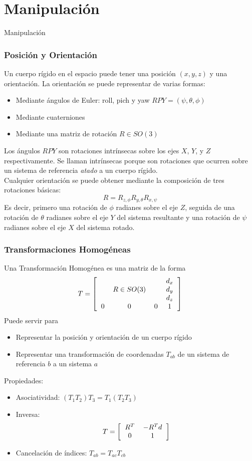 
\section{Manipulación}

\begin{frame}
  \Huge
  Manipulación
\end{frame}

\begin{frame}\frametitle{Posición y Orientación}
  Un cuerpo rígido en el espacio puede tener una posición $(x,y,z)$ y una orientación. La orientación se puede representar de varias formas:
  \begin{itemize}
  \item Mediante ángulos de Euler: roll, pich y yaw $RPY = (\psi, \theta, \phi)$
  \item Mediante cuaterniones
  \item Mediante una matriz de rotación $R \in SO(3)$
  \end{itemize}
  Los ángulos $RPY$ son rotaciones intrínsecas sobre los ejes $X$, $Y$, y $Z$ respectivamente. Se llaman intrínsecas porque son rotaciones que ocurren sobre un sistema de referencia \textit{atado} a un cuerpo rígido.\\
  Cualquier orientación se puede obtener mediante la composición de tres rotaciones básicas:
  \[R = R_{z,\phi}R_{y,\theta}R_{x,\psi}\]
  Es decir, primero una rotación de $\phi$ radianes sobre el eje $Z$, seguida de una rotación de $\theta$ radianes sobre el eje $Y$ del sistema resultante y una rotación de $\psi$ radianes sobre el eje $X$ del sistema rotado. 
\end{frame}

\begin{frame}\frametitle{Transformaciones Homogéneas}
  Una Transformación Homogénea es una matriz de la forma
  \[T = \left[\begin{tabular}{cccc}
      & & & $d_x$\\
      & $R\in SO(3)$ & & $d_y$\\
      & & & $d_z$\\
      0 & 0& 0 & 1
    \end{tabular}\right]\]
  Puede servir para
  \begin{itemize}
  \item Representar la posición y orientación de un cuerpo rígido
  \item Representar una transformación de coordenadas $T_{ab}$ de un sistema de referencia $b$ a un sistema $a$
  \end{itemize}
  Propiedades:
  \begin{itemize}
  \item Asociatividad: $(T_1 T_2) T_3 = T_1 (T_2 T_3)$
  \item Inversa:
    \[T = \left[\begin{tabular}{cc}
       $R^T$ & $-R^T d$\\
       0 & 1
      \end{tabular}\right]\]
  \item Cancelación de índices: $T_{ab} = T_{ac}T_{cb}$
  \end{itemize}
\end{frame}

